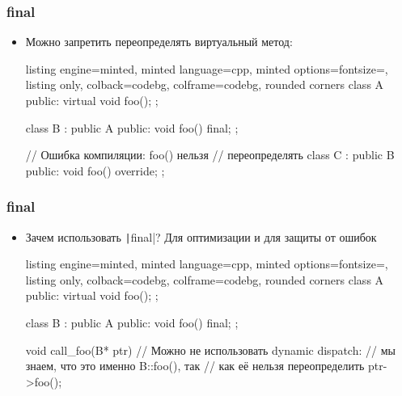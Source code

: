 \documentclass[10pt]{beamer}
\begin{document}
\begin{frame}[fragile]
\frametitle{final}
\begin{itemize}
\item Можно запретить переопределять виртуальный метод:
\begin{tcblisting}{listing engine=minted, minted language=cpp, minted options={fontsize=\scriptsize}, listing only, colback=codebg, colframe=codebg, rounded corners}
class A {
public:
  virtual void foo();
};

class B : public A {
public:
  void foo() final;
};

// Ошибка компиляции: foo() нельзя
// переопределять
class C : public B {
public:
  void foo() override;
};
\end{tcblisting}
\end{itemize}
\end{frame}

\begin{frame}[fragile]
\frametitle{final}
\begin{itemize}
\item Зачем использовать \texttt|final|? \pause Для оптимизации и для защиты от ошибок
\begin{tcblisting}{listing engine=minted, minted language=cpp, minted options={fontsize=\scriptsize}, listing only, colback=codebg, colframe=codebg, rounded corners}
class A {
public:
  virtual void foo();
};

class B : public A {
public:
  void foo() final;
};

void call_foo(B* ptr) {
  // Можно не использовать dynamic dispatch:
  // мы знаем, что это именно B::foo(), так
  // как её нельзя переопределить
  ptr->foo();
}
\end{tcblisting}
\end{itemize}
\end{frame}
\end{document}
